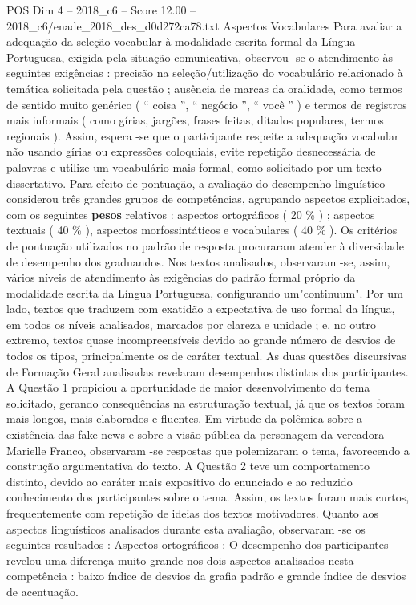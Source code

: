 \begin{textsample}{POS Dim 4 – 2018\_c6 – Score 12.00 – 2018\_c6/enade\_2018\_des\_d0d272ca78.txt}
Aspectos Vocabulares Para avaliar a adequação da seleção vocabular à modalidade escrita formal da Língua Portuguesa, exigida pela situação comunicativa, observou -se o atendimento às seguintes exigências : precisão na seleção/utilização do vocabulário relacionado à temática solicitada pela questão ; ausência de marcas da oralidade, como termos de sentido muito genérico ( “ coisa ”, “ negócio ”, “ você ” ) e termos de registros mais informais ( como gírias, jargões, frases feitas, ditados populares, termos regionais ).
Assim, espera -se que o participante respeite a adequação vocabular não usando gírias ou expressões coloquiais, evite repetição desnecessária de palavras e utilize um vocabulário mais formal, como solicitado por um texto dissertativo.
Para efeito de pontuação, a avaliação do desempenho linguístico considerou três grandes grupos de competências, agrupando aspectos explicitados, com os seguintes \textbf{pesos} relativos : aspectos ortográficos ( 20 \% ) ; aspectos textuais ( 40 \% ), aspectos morfossintáticos e vocabulares ( 40 \% ).
Os critérios de pontuação utilizados no padrão de resposta procuraram atender à diversidade de desempenho dos graduandos.
Nos textos analisados, observaram -se, assim, vários níveis de atendimento às exigências do padrão formal próprio da modalidade escrita da Língua Portuguesa, configurando um"continuum".
Por um lado, textos que traduzem com exatidão a expectativa de uso formal da língua, em todos os níveis analisados, marcados por clareza e unidade ; e, no outro extremo, textos quase incompreensíveis devido ao grande número de desvios de todos os tipos, principalmente os de caráter textual.
As duas questões discursivas de Formação Geral analisadas revelaram desempenhos distintos dos participantes.
A Questão 1 propiciou a oportunidade de maior desenvolvimento do tema solicitado, gerando consequências na estruturação textual, já que os textos foram mais longos, mais elaborados e fluentes.
Em virtude da polêmica sobre a existência das fake news e sobre a visão pública da personagem da vereadora Marielle Franco, observaram -se respostas que polemizaram o tema, favorecendo a construção argumentativa do texto.
A Questão 2 teve um comportamento distinto, devido ao caráter mais expositivo do enunciado e ao reduzido conhecimento dos participantes sobre o tema.
Assim, os textos foram mais curtos, frequentemente com repetição de ideias dos textos motivadores.
Quanto aos aspectos linguísticos analisados durante esta avaliação, observaram -se os seguintes resultados : Aspectos ortográficos : O desempenho dos participantes revelou uma diferença muito grande nos dois aspectos analisados nesta competência : baixo índice de desvios da grafia padrão e grande índice de desvios de acentuação.

\end{textsample}
